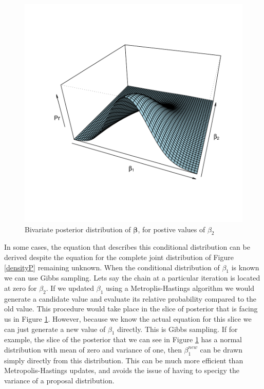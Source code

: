 \documentclass{article}
\begin{document}
\begin{figure}[!h]
\begin{center}
\includegraphics{Tutorial-007}
\end{center}
\caption{Bivariate posterior distribution of $\bm{\beta}$, for postive values of $\beta_{2}$}
\label{densityPgibbs}
\end{figure}

 In some cases, the equation that describes this conditional distribution can be derived despite the equation for the complete joint distribution of Figure \ref{densityP} remaining unknown.  When the conditional distribution of $\beta_{1}$ is known we can use Gibbs sampling. Lets say the chain at a particular iteration is located at zero for $\beta_{2}$.  If we updated $\beta_{1}$ using a Metroplis-Hastings algorithm we would generate a candidate value and evaluate its relative probability compared to the old value.  This procedure would take place in the slice of posterior that is facing us in Figure \ref{densityPgibbs}. However, because we know the actual equation for this slice we can just generate a new value of $\beta_{1}$ directly. This is Gibbs sampling.  If for example, the slice of the posterior that we can see in Figure \ref{densityPgibbs} has a normal distribution with mean of zero and variance of one, then $\beta_{1}^{new}$ can be drawn simply directly from this distribution. This can be much more efficient than Metropolis-Hastings updates, and avoids the issue of having to specigy the variance of a proposal distribution.\\
\end{document}
